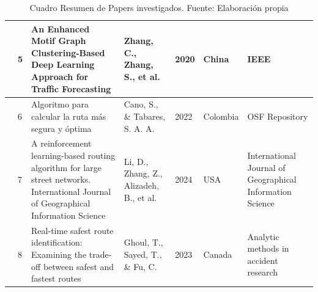 \begin{table}[h]
\begin{tabular}{|m{0.5cm}|m{0.3cm}|m{4cm}|m{2cm}|m{0.6cm}|m{1.7cm}|m{3cm}|}
		\cline{2-7}
		& 5                                             & An Enhanced Motif Graph Clustering-Based Deep Learning Approach for Traffic Forecasting                                                                               & Zhang, C., Zhang, S., et al.                                          & 2020                                        & China                                          & IEEE                                                            \\ 
		\hline
		\multirow{3}{*}[-28ex]{\rotcell{\rlap{Técnica}}}                                          & 6                                             & Algoritmo para calcular la ruta más segura y óptima                   & Cano, S., \& Tabares, S. A. A.                                      & 2022                                       & Colombia                                        & OSF Repository  \\ 
		\cline{2-7}
		& 7                                             & A reinforcement learning-based routing algorithm for large street networks. International Journal of Geographical Information Science                                                    & Li, D., Zhang, Z., Alizadeh, B., et al.          & 2024                                        & USA                                        & International Journal of Geographical Information Science              \\ 
		\cline{2-7}
		& 8                                             & Real-time safest route identification: Examining the trade-off between safest and fastest routes & Ghoul, T., Sayed, T., \& Fu, C.             & 2023                                        & Canada                                         & Analytic methods in accident research              \\ 
		\hline
	\end{tabular}
	\caption{Cuadro Resumen de Papers investigados. Fuente: Elaboración propia}
\label{A:table}
\end{table}




